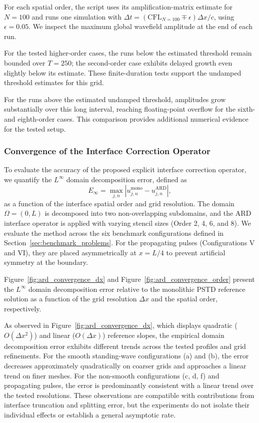 \documentclass{Configuration_Files/PoliMi3i_thesis}
\newif\ifshowthesischanges
\DeclareRobustCommand{\thesischange}[2]{%
    \ifshowthesischanges
        \textcolor{#1}{#2}%
    \else
        #2%
    \fi
}
\def\thesischange#1#2{#2}%
\begin{document}
For each spatial order, the script uses its amplification-matrix estimate for $N=100$ and runs one simulation with $\Delta t=(\mathrm{CFL}_{N=100}\mp\epsilon)\Delta x/c$, using $\epsilon=0.05$. We inspect the maximum global wavefield amplitude at the end of each run.

For the tested higher-order cases, the runs below the estimated threshold remain bounded over $T=250$; the second-order case exhibits delayed growth even slightly below its estimate. These finite-duration tests support the undamped threshold estimates for this grid.

For the runs above the estimated undamped threshold, amplitudes grow substantially over this long interval, reaching floating-point overflow for the sixth- and eighth-order cases. This comparison provides additional numerical evidence for the tested setup.

\subsubsection{Convergence of the Interface Correction Operator}
\label{sec:accuracy_analysis}

To evaluate the accuracy of the proposed explicit interface correction operator, we quantify the $L^\infty$ domain decomposition error, defined as
\begin{equation*}
E_{\infty} = \max_{j,n} \left| u_{j,n}^{\text{mono}} - u_{j,n}^{\text{ARD}} \right|,
\end{equation*}
as a function of the interface spatial order and grid resolution. The domain $\Omega=(0,L)$ is decomposed into two non-overlapping subdomains, and the ARD interface operator is applied with varying stencil sizes (Order 2, 4, 6, and 8). We evaluate the method across the six benchmark configurations defined in Section~\ref{sec:benchmark_problems}. For the propagating pulses (Configurations V and VI), they are placed asymmetrically at $x=L/4$ to prevent artificial symmetry at the boundary.

Figure~\ref{fig:ard_convergence_dx} and Figure~\ref{fig:ard_convergence_order} present the $L^\infty$ domain decomposition error relative to the monolithic PSTD reference solution as a function of the grid resolution $\Delta x$ and the spatial order, respectively. 

\thesischange{red}{As observed in Figure~\ref{fig:ard_convergence_dx}, which displays quadratic ($O(\Delta x^2)$) and linear ($O(\Delta x)$) reference slopes, the empirical domain decomposition error exhibits different trends across the tested profiles and grid refinements. For the smooth standing-wave configurations (a) and (b), the error decreases approximately quadratically on coarser grids and approaches a linear trend on finer meshes. For the non-smooth configurations (c, d, f) and propagating pulses, the error is predominantly consistent with a linear trend over the tested resolutions. These observations are compatible with contributions from interface truncation and splitting error, but the experiments do not isolate their individual effects or establish a general asymptotic rate.}
\end{document}
